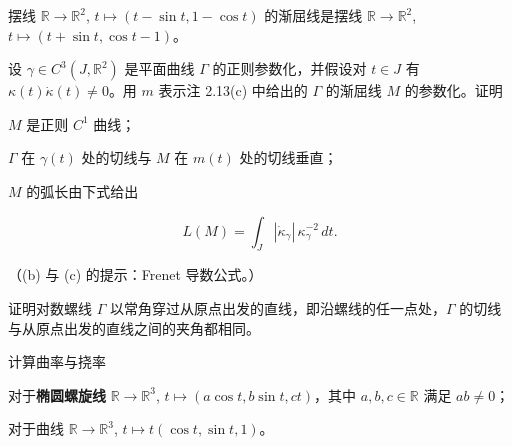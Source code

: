 \begin{exercises}
\begin{items}
摆线 $ \mathbb{R} \to \mathbb{R}^{2} $, $ t \mapsto (t - \sin t, 1 - \cos t) $ 的渐屈线是摆线 $ \mathbb{R} \to \mathbb{R}^{2} $, $ t \mapsto (t + \sin t, \cos t - 1) $。


\end{items}

\item

设 $ \gamma \in C^{3}(J, \mathbb{R}^{2}) $ 是平面曲线 $ \Gamma $ 的正则参数化，并假设对 $ t \in J $ 有 $ \kappa(t)\dot\kappa(t) \ne 0 $。用 $ m $ 表示注 2.13(c) 中给出的 $ \Gamma $ 的渐屈线 $ M $ 的参数化。证明

\begin{items}
\item

$ M $ 是正则 $ C^{1} $ 曲线；

\item

$ \Gamma $ 在 $ \gamma(t) $ 处的切线与 $ M $ 在 $ m(t) $ 处的切线垂直；

\item

$ M $ 的弧长由下式给出

\[
L(M) = \int_{J} |\dot\kappa_{\gamma}|\,\kappa_{\gamma}^{-2}\,dt .
\]

（(b) 与 (c) 的提示：Frenet 导数公式。）

\end{items}

\item

证明对数螺线 $ \Gamma $ 以常角穿过从原点出发的直线，即沿螺线的任一点处，$ \Gamma $ 的切线与从原点出发的直线之间的夹角都相同。

\item

计算曲率与挠率

\begin{items}
\item

对于\textbf{椭圆螺旋线} $ \mathbb{R} \to \mathbb{R}^{3} $, $ t \mapsto (a\cos t, b\sin t, ct) $，其中 $ a, b, c \in \mathbb{R} $ 满足 $ ab \ne 0 $；

\item

对于曲线 $ \mathbb{R} \to \mathbb{R}^{3} $, $ t \mapsto t(\cos t, \sin t, 1) $。

\end{items}


\end{exercises}
